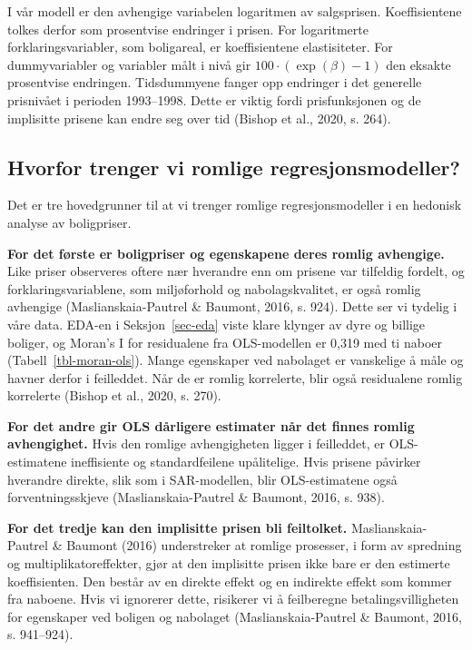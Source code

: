 \documentclass[
  norsk,
  a4paper,
]{article}
\begin{document}
I vår modell er den avhengige variabelen logaritmen av salgsprisen.
Koeffisientene tolkes derfor som prosentvise endringer i prisen. For
logaritmerte forklaringsvariabler, som boligareal, er koeffisientene
elastisiteter. For dummyvariabler og variabler målt i nivå gir
\(100 \cdot (\exp(\beta) - 1)\) den eksakte prosentvise endringen.
Tidsdummyene fanger opp endringer i det generelle prisnivået i perioden
1993--1998. Dette er viktig fordi prisfunksjonen og de implisitte
prisene kan endre seg over tid (Bishop et al., 2020, s. 264).

\subsection{Hvorfor trenger vi romlige
regresjonsmodeller?}\label{hvorfor-trenger-vi-romlige-regresjonsmodeller}

Det er tre hovedgrunner til at vi trenger romlige regresjonsmodeller i
en hedonisk analyse av boligpriser.

\textbf{For det første er boligpriser og egenskapene deres romlig
avhengige.} Like priser observeres oftere nær hverandre enn om prisene
var tilfeldig fordelt, og forklaringsvariablene, som miljøforhold og
nabolagskvalitet, er også romlig avhengige (Maslianskaia-Pautrel \&
Baumont, 2016, s. 924). Dette ser vi tydelig i våre data. EDA-en i
Seksjon~\ref{sec-eda} viste klare klynger av dyre og billige boliger, og
Moran's I for residualene fra OLS-modellen er 0,319 med ti naboer
(Tabell~\ref{tbl-moran-ols}). Mange egenskaper ved nabolaget er
vanskelige å måle og havner derfor i feilleddet. Når de er romlig
korrelerte, blir også residualene romlig korrelerte (Bishop et al.,
2020, s. 270).

\textbf{For det andre gir OLS dårligere estimater når det finnes romlig
avhengighet.} Hvis den romlige avhengigheten ligger i feilleddet, er
OLS-estimatene ineffisiente og standardfeilene upålitelige. Hvis prisene
påvirker hverandre direkte, slik som i SAR-modellen, blir OLS-estimatene
også forventningsskjeve (Maslianskaia-Pautrel \& Baumont, 2016, s. 938).

\textbf{For det tredje kan den implisitte prisen bli feiltolket.}
Maslianskaia-Pautrel \& Baumont (2016) understreker at romlige
prosesser, i form av spredning og multiplikatoreffekter, gjør at den
implisitte prisen ikke bare er den estimerte koeffisienten. Den består
av en direkte effekt og en indirekte effekt som kommer fra naboene. Hvis
vi ignorerer dette, risikerer vi å feilberegne betalingsvilligheten for
egenskaper ved boligen og nabolaget (Maslianskaia-Pautrel \& Baumont,
2016, s. 941--924).
\end{document}
